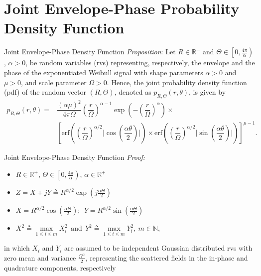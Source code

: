 \documentclass[aspectratio=169]{beamer}
\begin{document}
\section{Joint Envelope-Phase Probability Density Function}
\begin{frame}{Joint Envelope-Phase Density Function}
    \textit{Proposition}: Let $R \in \mathbb{R}^{+}$ and $\Theta \in \left[0,\frac{4\pi}{\alpha}\right)$, $\alpha > 0$, be random variables (rvs) representing, respectively, the envelope and the phase of the exponentiated Weibull signal with shape parameters $\alpha > 0$ and $\mu > 0$, and scale parameter $\Omega > 0$. Hence, the joint probability density function (pdf) of the random vector $(R,\Theta)$, denoted as $p_{R,\Theta}(r,\theta)$, is given by
\begin{align*}
    p_{R,\Theta}(r,\theta) = &\dfrac{(\alpha\mu)^2}{4\pi\Omega}\left(\dfrac{r}{\Omega}\right)^{\alpha-1}\exp\left(-\left(\dfrac{r}{\Omega}\right)^{\alpha}\right)\times\\
    &\left[\mathrm{erf}\left(\left(\dfrac{r}{\Omega}\right)^{\alpha/2}\Bigg|\cos\left(\dfrac{\alpha\theta}{2}\right)\Bigg|\right)\times\mathrm{erf}\left(\left(\dfrac{r}{\Omega}\right)^{\alpha/2}\Bigg|\sin\left(\dfrac{\alpha\theta}{2}\right)\Bigg|\right)\right]^{\mu-1}.
\label{eq:joint_pdf}
\end{align*}
\end{frame}

\begin{frame}{Joint Envelope-Phase Density Function}
    \textit{Proof:}
    \begin{itemize}
        \item $R \in \mathbb{R}^{+}$, $\Theta \in \left[0, \frac{4\pi}{\alpha}\right)$, $\alpha \in \mathbb{R}^{+}$
        \item $Z = X + jY \triangleq R^{\alpha/2}\exp\left(j\frac{\alpha\Theta}{2}\right)$
        \item $X = R^{\alpha/2}\cos\left(\frac{\alpha\Theta}{2}\right); ~~ Y = R^{\alpha/2}\sin\left(\frac{\alpha\Theta}{2}\right)$
        \item $X^2 \triangleq \max\limits_{1 \leq i \leq m} X_i^2 ~~\text{and} ~~ Y^2 \triangleq \max\limits_{1 \leq i \leq m} Y^2_i,~m \in \mathbb{N}$,
    \end{itemize}
    in which $X_i$ and $Y_i$ are assumed to be independent Gaussian distributed rvs with zero mean and variance $\frac{\Omega^\alpha}{2}$, representing the scattered fields in the in-phase and quadrature components, respectively
\end{frame}
\end{document}
